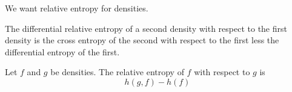 

We want relative entropy for densities.


The differential relative entropy of
a second density with respect to the
first density is the cross entropy
of the second with respect to the first
less the differential entropy of the first.


Let $f$ and $g$ be densities.
The relative entropy of $f$ with respect to $g$
is
\[
  h(g, f) - h(f)
\]

\blankpage
